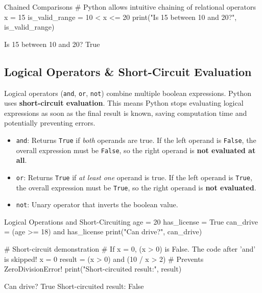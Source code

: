 \begin{pythoncode}{Chained Comparisons}
# Python allows intuitive chaining of relational operators
x = 15
is_valid_range = 10 < x <= 20
print("Is 15 between 10 and 20?", is_valid_range)
\end{pythoncode}

\begin{outputbox}
Is 15 between 10 and 20? True
\end{outputbox}

\subsection{Logical Operators \& Short-Circuit Evaluation}

Logical operators (\texttt{and}, \texttt{or}, \texttt{not}) combine multiple boolean expressions. 
Python uses \textbf{short-circuit evaluation}. This means Python stops evaluating logical expressions as soon as the final result is known, saving computation time and potentially preventing errors.

\begin{itemize}[leftmargin=1.5em]
    \item \texttt{and}: Returns \texttt{True} if \textit{both} operands are true. If the left operand is \texttt{False}, the overall expression must be \texttt{False}, so the right operand is \textbf{not evaluated at all}.
    \item \texttt{or}: Returns \texttt{True} if \textit{at least one} operand is true. If the left operand is \texttt{True}, the overall expression must be \texttt{True}, so the right operand is \textbf{not evaluated}.
    \item \texttt{not}: Unary operator that inverts the boolean value.
\end{itemize}

\begin{pythoncode}{Logical Operations and Short-Circuiting}
age = 20
has_license = True
can_drive = (age >= 18) and has_license
print("Can drive?", can_drive)

# Short-circuit demonstration
# If x = 0, (x > 0) is False. The code after 'and' is skipped!
x = 0
result = (x > 0) and (10 / x > 2) # Prevents ZeroDivisionError!
print("Short-circuited result:", result)
\end{pythoncode}

\begin{outputbox}
Can drive? True
Short-circuited result: False
\end{outputbox}

